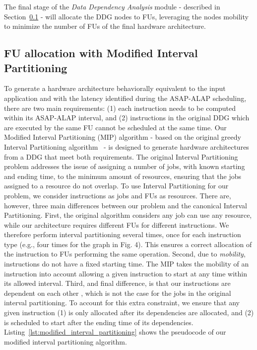 The final stage of the \textit{Data Dependency Analysis} module - described in Section~\ref{ssec:modified_interval_partitioning} - will allocate the DDG nodes to FUs, leveraging the nodes mobility to minimize the number of FUs of the final hardware architecture. 

\subsection{FU allocation with Modified Interval Partitioning}
\label{ssec:modified_interval_partitioning}
To generate a hardware architecture behaviorally equivalent to the input application and with the latency identified during the ASAP-ALAP scheduling, there are two main requirements: (1) each instruction needs to be computed within its ASAP-ALAP interval, and (2) instructions in the original DDG which are executed by the same FU cannot be scheduled at the same time.
Our Modified Interval Partitioning (MIP) algorithm - based on the original greedy Interval Partitioning algorithm~\cite{greedyIntervalPartitioning} - is designed to generate hardware architectures from a DDG that meet both requirements. The original Interval Partitioning problem addresses the issue of assigning a number of jobs, with known starting and ending time, to the minimum amount of resources, ensuring that the jobs assigned to a resource do not overlap. To use Interval Partitioning for our problem, we consider instructions as jobs and FUs as resources. There are, however, three main differences between our problem and the canonical Interval Partitioning. 
First, the original algorithm considers any job can use any resource, while our architecture requires different FUs for different instructions. We therefore perform interval partitioning several times, once for each instruction type (e.g., four times for the graph in Fig. 4). This ensures a correct allocation of the instruction to FUs performing the same operation. Second, due to \textit{mobility}, instructions do not have a fixed starting time. The MIP takes the mobility of an instruction into account allowing a given instruction to start at any time within its allowed interval. Third, and final difference, is that our instructions are dependent on each other , which is not the case for the jobs in the original interval partitioning. To account for this extra constraint, we ensure that any given instruction (1) is only allocated after its dependencies are allocated, and (2) is scheduled to start after the ending time of its dependencies.
Listing~\ref{lst:modified_interval_partitioning} shows the pseudocode of our modified interval partitioning algorithm. 
